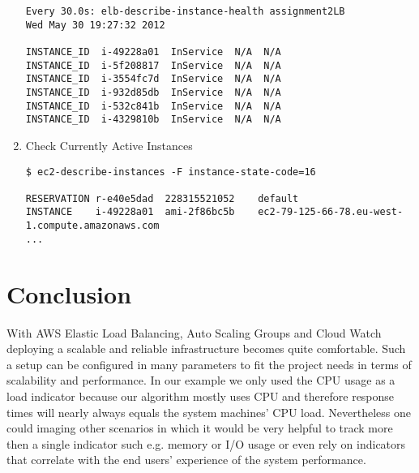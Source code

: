 \documentclass{article}
\begin{document}
\begin{enumerate}
\begin{verbatim}
Every 30.0s: elb-describe-instance-health assignment2LB
Wed May 30 19:27:32 2012

INSTANCE_ID  i-49228a01  InService  N/A  N/A
INSTANCE_ID  i-5f208817  InService  N/A  N/A
INSTANCE_ID  i-3554fc7d  InService  N/A  N/A
INSTANCE_ID  i-932d85db  InService  N/A  N/A
INSTANCE_ID  i-532c841b  InService  N/A  N/A
INSTANCE_ID  i-4329810b  InService  N/A  N/A
\end{verbatim}

	\item Check Currently Active Instances
\begin{verbatim}
$ ec2-describe-instances -F instance-state-code=16

RESERVATION	r-e40e5dad	228315521052	default
INSTANCE	i-49228a01	ami-2f86bc5b	ec2-79-125-66-78.eu-west-1.compute.amazonaws.com 
...
\end{verbatim}
\end{enumerate}

\setcounter{section}{4}
\section{Conclusion}
With AWS Elastic Load Balancing, Auto Scaling Groups and Cloud Watch deploying a scalable and reliable infrastructure becomes quite comfortable.
Such a setup can be configured in many parameters to fit the project needs in terms of scalability and performance.
In our example we only used the CPU usage as a load indicator because our algorithm mostly uses CPU and therefore response times will 
nearly always equals the system machines' CPU load. Nevertheless one could imaging other scenarios in which it would be very helpful to track
more then a single indicator such e.g. memory or I/O usage or even rely on indicators that correlate with the end users' experience of the 
system performance.
\end{document}
